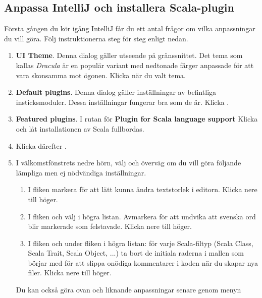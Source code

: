 \subsection{Anpassa IntelliJ och installera Scala-plugin}\label{appendix:ide:intellij:tweak}
Första gången du kör igång IntelliJ får du ett antal frågor om vilka anpassningar du vill göra. Följ instruktionerna steg för steg enligt nedan.
\begin{enumerate}
\item \textbf{UI Theme}. Denna dialog gäller utseende på gränssnittet. Det tema som kallas \textit{Dracula} är en populär variant med nedtonade färger anpassade för att vara skonsamma mot ögonen. Klicka  när du valt tema.

\item \textbf{Default plugins}. Denna dialog gäller inställningar av befintliga insticksmoduler. Dessa inställningar fungerar bra som de är. Klicka .

\item \textbf{Featured plugins}. I rutan för \textbf{Plugin for Scala language support} Klicka  och låt installationen av Scala fullbordas.

\item Klicka därefter .

\item I välkomstfönstrets nedre hörn, välj  och överväg om du vill göra följande lämpliga men ej nödvändiga inställningar.
\begin{enumerate}
\item I fliken  markera  för att lätt kunna ändra textstorlek i editorn. Klicka  nere till höger.

\item I fliken  och välj  i högra listan. Avmarkera  för att undvika att svenska ord blir markerade som felstavade. Klicka  nere till höger.

\item I fliken  och under fliken  i högra listan: för varje Scala-filtyp (Scala Class, Scala Trait, Scala Object, ...) ta bort de initiala raderna i mallen som börjar med \code{#} för att slippa onödiga kommentarer i koden när du skapar nya filer. Klicka  nere till höger.

\end{enumerate}
Du kan också göra ovan och liknande anpassningar senare genom menyn 
\end{enumerate}





